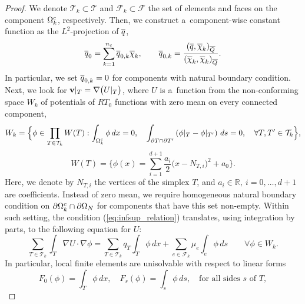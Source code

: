 {\begin{proof} 
We denote 
$\mathcal{T}_k\subset \mathcal{T}$ and $\mathcal{F}_k\subset \mathcal{F}$ the set 
of elements and faces on the component $\Omega^c_k$, respectively. Then, we 
construct a~component-wise constant function as the $L^2$-projection of $\overline{q}$,
\begin{equation*}
  \overline{q}_0 = \sum_{k=1}^{n_c} \overline{q}_{0, k} \overline\chi_k,
  \qquad  
  \overline{q}_{0, k} = \frac{ (\overline{q}, \overline\chi_k)_{\overline{Q}} }
  { (\overline\chi_k, \overline\chi_k)_{\overline{Q}} }.
\end{equation*}
In particular, we set $\overline{q}_{0,k} = 0$ for components with natural boundary 
condition. Next, we look for $\mathbf{v}|_T = \nabla \big(U|_T\big)$, 
where $U$ is a~function  
from the 
non-conforming space $W_k$ of potentials of $RT_{0}$ functions with zero mean on every 
connected component,
\begin{equation*}
  W_k =\Big\{\phi\in \prod_{T\in \mathcal{T}_k} W(T) : 
    \int_{\Omega^c_k} \phi \,dx =0,\quad
    \int_{\partial T \cap \partial T'} 
    \left( \phi|_{T} - \phi|_{T'}\right) \,ds = 0,\quad \forall 
T,T'\in\mathcal{T}_k\Big\}, 
\end{equation*}
\begin{equation*}
  W(T)=\Big\{\phi(x) = \sum_{i=1}^{d+1} 
    \frac{a_i}{2} \big(x - N_{T,i}\big)^2 + a_0\Big\}.  
\end{equation*}
Here, we denote by $N_{T,i}$ the vertices of the simplex $T$, and $a_i \in \mathbb{R},\ i = 0,\dots,d+1$ are coefficients. 
Instead of zero mean, we require homogeneous natural boundary condition on 
$\partial \Omega^c_k \cap \partial \Omega_{N}$ for components that have this 
set non-empty.
Within such setting, the 
condition (\ref{eq:infsup_relation}) translates, using integration by parts, to 
the following equation for $U$:
\begin{equation}
\label{eq:U} 
 \sum_{T\in \mathcal{T}_k} \int_{T} \nabla U \cdot \nabla \phi = 
\sum_{T\in \mathcal{T}_k} q_T \int_{T} \phi\,dx + 
\sum_{e\in \mathcal{F}_k} \mu_e \int_{e} \phi\,ds\qquad 
\forall \phi\in W_k. 
\end{equation}
In particular, local finite elements are unisolvable with respect to linear 
forms
\begin{equation*}
  F_0(\phi)=\int_T \phi\, dx,\quad F_s(\phi) = \int_{s} \phi\, ds,\quad 
\text{for all sides $s$ of $T$},

\end{equation*}
\end{proof}}
